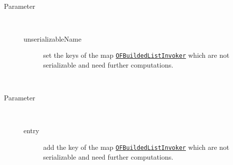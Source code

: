 \begin{description}
~ 
\begin{description}
\item[Parameter] ~
\begin{description}
\item[unserializableName]
set the keys of the map \texttt{\hyperlink{ontologyFramework.OFRunning.OFInvokingManager.OFBuildedListInvoker-class}{OFBuildedListInvoker}} which are not serializable and need further computations.
\end{description}
\end{description}
\item[{\ltdHypertarget{ontologyFramework.OFRunning.OFSystemState.addToSerializableListName(java.lang.String)}{addToSerializableListName}\label{ontologyFramework.OFRunning.OFSystemState.addToSerializableListName(java.lang.String)}}]
~ 
\begin{description}
\item[Parameter] ~
\begin{description}
\item[entry]
add the key of the map \texttt{\hyperlink{ontologyFramework.OFRunning.OFInvokingManager.OFBuildedListInvoker-class}{OFBuildedListInvoker}} which are not serializable and need further computations.
\end{description}
\end{description}
\end{description}
